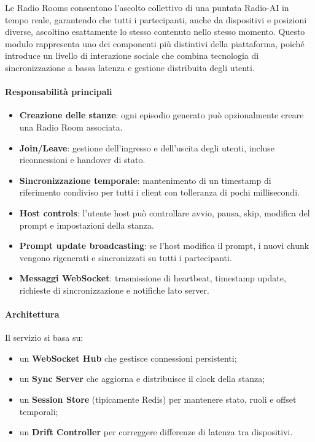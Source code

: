 \documentclass[11pt,a4paper]{article}
\begin{document}
Le Radio Rooms consentono l'ascolto collettivo di una puntata Radio-AI in tempo reale, garantendo che tutti i partecipanti, anche da dispositivi e posizioni diverse, ascoltino esattamente lo stesso contenuto nello stesso momento. Questo modulo rappresenta uno dei componenti più distintivi della piattaforma, poiché introduce un livello di interazione sociale che combina tecnologia di sincronizzazione a bassa latenza e gestione distribuita degli utenti.

\paragraph{Responsabilità principali}
\begin{itemize}
    \item \textbf{Creazione delle stanze}: ogni episodio generato può opzionalmente creare una Radio Room associata.
    \item \textbf{Join/Leave}: gestione dell’ingresso e dell’uscita degli utenti, incluse riconnessioni e handover di stato.
    \item \textbf{Sincronizzazione temporale}: mantenimento di un timestamp di riferimento condiviso per tutti i client con tolleranza di pochi millisecondi.
    \item \textbf{Host controls}: l’utente host può controllare avvio, pausa, skip, modifica del prompt e impostazioni della stanza.
    \item \textbf{Prompt update broadcasting}: se l'host modifica il prompt, i nuovi chunk vengono rigenerati e sincronizzati su tutti i partecipanti.
    \item \textbf{Messaggi WebSocket}: trasmissione di heartbeat, timestamp update, richieste di sincronizzazione e notifiche lato server.
\end{itemize}

\paragraph{Architettura}
Il servizio si basa su:
\begin{itemize}
    \item un \textbf{WebSocket Hub} che gestisce connessioni persistenti;
    \item un \textbf{Sync Server} che aggiorna e distribuisce il clock della stanza;
    \item un \textbf{Session Store} (tipicamente Redis) per mantenere stato, ruoli e offset temporali;
    \item un \textbf{Drift Controller} per correggere differenze di latenza tra dispositivi.
\end{itemize}
\end{document}
